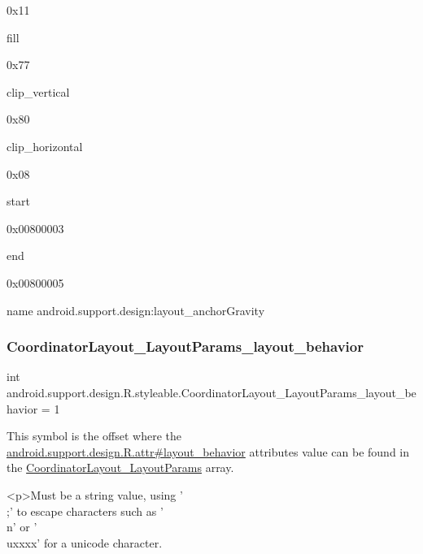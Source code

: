 0x11

{\ttfamily fill}

0x77

{\ttfamily clip\+\_\+vertical}

0x80

{\ttfamily clip\+\_\+horizontal}

0x08

{\ttfamily start}

0x00800003

{\ttfamily end}

0x00800005

name android.\+support.\+design\+:layout\+\_\+anchor\+Gravity \mbox{\label{classandroid_1_1support_1_1design_1_1R_1_1styleable_a7080bda2bea789b4e55596a0b650c34e}} 
\subsubsection{\texorpdfstring{Coordinator\+Layout\+\_\+\+Layout\+Params\+\_\+layout\+\_\+behavior}{CoordinatorLayout\_LayoutParams\_layout\_behavior}}
{\footnotesize\ttfamily int android.\+support.\+design.\+R.\+styleable.\+Coordinator\+Layout\+\_\+\+Layout\+Params\+\_\+layout\+\_\+behavior = 1\hspace{0.3cm}{\ttfamily [static]}}

This symbol is the offset where the \hyperlink{classandroid_1_1support_1_1design_1_1R_1_1attr_a807030d508a6ab7e9217a012836ab5f1}{android.\+support.\+design.\+R.\+attr\#layout\+\_\+behavior} attribute\textquotesingle{}s value can be found in the \hyperlink{classandroid_1_1support_1_1design_1_1R_1_1styleable_a8dd236b417b377b73830c1c47c3b2490}{Coordinator\+Layout\+\_\+\+Layout\+Params} array.

\begin{DoxyVerb}      <p>Must be a string value, using '\\;' to escape characters such as '\\n' or '\\uxxxx' for a unicode character.
\end{DoxyVerb}
 


